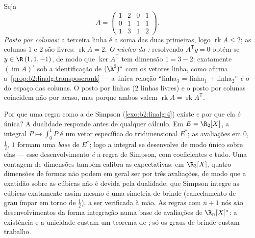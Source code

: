 \begin{example}\label{ex:b2:linalg:rankbothsides}
Seja
\[
A = \begin{pmatrix}
1 & 2 & 0 & 1\\
0 & 1 & 1 & 1\\
1 & 3 & 1 & 2
\end{pmatrix} .
\]
\emph{Posto por colunas:} a terceira linha é a soma das duas primeiras, logo
$\operatorname{rk} A \leq 2$; as colunas $1$ e $2$ são livres:
$\operatorname{rk} A = 2$. \emph{O núcleo da :} resolvendo
$A^{\mathsf T}y = 0$ obtém-se $y \in \R\,(1, 1, -1)$, de modo que $\ker
A^{\mathsf T}$ tem dimensão $1 = 3 - 2$: exatamente
$(\operatorname{im} A)^\circ$ sob a identificação de
$(\R^3)^*$ com os vetores linha, como
afirma a~\cref{prop:b2:linalg:transposerank} --- a única
relação ``linha$_3$ = linha$_1$ + linha$_2$'' \emph{é} o
 do espaço das colunas. O posto por linhas ($2$ linhas livres) e
o posto por colunas coincidem não por acaso, mas porque ambos valem
$\operatorname{rk} A = \operatorname{rk} A^{\mathsf T}$.
\end{example}

\begin{example}\label{ex:b2:linalg:quadratureread}
Por que uma regra como a de Simpson (\cref{exo:b2:linalg:4}) existe
e por que ela é única? A dualidade responde antes de qualquer cálculo.
Em $E = \R_2[X]$, a integral $P \mapsto \int_0^1 P$ é um
vetor específico do  tridimensional $E^*$; as
avaliações em $0$, $\frac12$, $1$ formam uma \emph{base} de
$E^*$; logo a integral se desenvolve de modo único sobre elas --- esse
desenvolvimento \emph{é} a regra de Simpson, com coeficientes e tudo. Uma
contagem de dimensões também calibra as expectativas: em $\R_3[X]$,
quatro dimensões de formas não podem em geral ser  por três
avaliações, de modo que a exatidão sobre as cúbicas não é devida pela dualidade;
que Simpson integre as cúbicas exatamente assim mesmo é uma simetria
de brinde (cancelamento de grau ímpar em torno de $\frac12$), a ser
verificada à mão. As regras com $n + 1$ nós são desenvolvimentos da
forma integração numa base de avaliações de $\R_n[X]^*$:
a existência e a unicidade custam um teorema de ; só os
graus de brinde custam trabalho.
\end{example}

